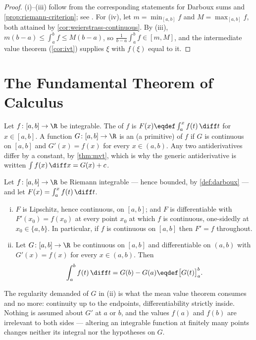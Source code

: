 \begin{proof}
	(i)--(iii) follow from the corresponding statements for Darboux sums and
	\autoref{prop:riemann-criterion}; see
	\textcite[Thm.~6.12]{rudin1976principles}. For (iv), let
	$m=\min_{[a,b]}f$ and $M=\max_{[a,b]}f$, both attained by
	\autoref{cor:weierstrass-continuous}. By (iii),
	$m(b-a)\leq\int_a^bf\leq M(b-a)$, so $\frac{1}{b-a}\int_a^bf\in[m,M]$, and the
	intermediate value theorem (\autoref{cor:ivt}) supplies $\xi$ with
	$f(\xi)$ equal to it.
\end{proof}

\section{The Fundamental Theorem of Calculus}\label{sec:int-ftc}

\begin{definition}\label{def:antiderivative}
	Let $f\colon[a,b]\to\R$ be integrable. The  of $f$ is
	$F(x)\eqdef\int_a^xf(t)\,\diff t$ for $x\in[a,b]$. A function
	$G\colon[a,b]\to\R$ is an  (a primitive)
	of $f$ if $G$ is continuous on $[a,b]$ and $G'(x)=f(x)$ for every $x\in(a,b)$.
	Any two antiderivatives differ by a constant, by \autoref{thm:mvt}, which is
	why the generic antiderivative is written $\int f(x)\,\diff x=G(x)+c$.
\end{definition}

\begin{theorem}\label{thm:ftc}
	Let $f\colon[a,b]\to\R$ be Riemann integrable --- hence bounded, by
	\autoref{def:darboux} --- and let $F(x)=\int_a^xf(t)\,\diff t$.
	\begin{enumerate}[(i)]
		\item $F$ is Lipschitz, hence continuous, on $[a,b]$; and $F$ is
		      differentiable with $F'(x_0)=f(x_0)$ at every point $x_0$ at which $f$ is
		      continuous, one-sidedly at $x_0\in\{a,b\}$. In particular, if $f$ is
		      continuous on $[a,b]$ then $F'=f$ throughout.
		\item Let $G\colon[a,b]\to\R$ be continuous on $[a,b]$ and differentiable on
		      $(a,b)$ with $G'(x)=f(x)$ for every $x\in(a,b)$. Then
		      \[
			      \int_a^bf(t)\,\diff t=G(b)-G(a)\eqdef\bigl[G(t)\bigr]_a^b .
		      \]
	\end{enumerate}
\end{theorem}

The regularity demanded of $G$ in (ii) is what the mean value theorem
consumes and no more: continuity up to the endpoints, differentiability strictly
inside. Nothing is assumed about $G'$ at $a$ or $b$, and the values $f(a)$ and
$f(b)$ are irrelevant to both sides --- altering an integrable function at
finitely many points changes neither its integral nor the hypotheses on $G$.

